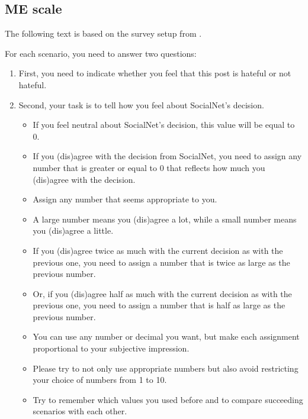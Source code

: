 \subsection{ME scale}
The following text is based on the survey setup from \citet{moskowitz1977magnitude}.\\

\begin{flushleft}
    For each scenario, you need to answer two questions:
\end{flushleft}

\begin{enumerate}
    \item First, you need to indicate whether you feel that this post is hateful or not hateful.
    \item Second, your task is to tell how you feel about SocialNet's decision.
          \begin{itemize}
              \item If you feel neutral about SocialNet's decision, this value will be equal to 0.
              \item If you (dis)agree with the decision from SocialNet, you need to assign any number that is greater or equal to 0 that reflects how much you (dis)agree with the decision.
              \item Assign any number that seems appropriate to you.
              \item A large number means you (dis)agree a lot, while a small number means you (dis)agree a little.
              \item If you (dis)agree twice as much with the current decision as with the previous one, you need to assign a number that is twice as large as the previous number.
              \item Or, if you (dis)agree half as much with the current decision as with the previous one, you need to assign a number that is half as large as the previous number.
              \item You can use any number or decimal you want, but make each assignment proportional to your subjective impression.
              \item Please try to not only use appropriate numbers but also avoid restricting your choice of numbers from 1 to 10.
              \item Try to remember which values you used before and to compare succeeding scenarios with each other.
          \end{itemize}
\end{enumerate}

